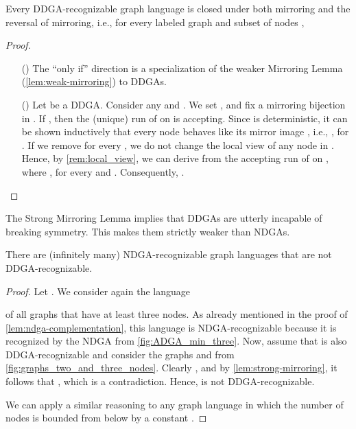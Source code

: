 \documentclass[a4paper,11pt,twoside]{report} \pdfoutput=1
\begin{document}
\begin{lemma} \label{lem:strong-mirroring}
  Every DDGA-recognizable graph language  is closed under both
  mirroring and the reversal of mirroring, i.e., for every labeled
  graph  and subset of nodes ,
  
\end{lemma}

\begin{proof}~
  \vspace{-1ex}
  \begin{itemize}
  \item[()] The “only if” direction is a specialization of the
    weaker Mirroring Lemma (\cref{lem:weak-mirroring}) to DDGAs.
  \item[()] Let  be a DDGA. Consider any
     and . We set ,
    and fix a mirroring bijection  in
    . If , then the (unique) run
     of  on  is
    accepting. Since  is deterministic, it can be shown
    inductively that every node  behaves like its mirror image
    , i.e., , for . If we remove
     for every , we do not change the local view of any
    node in . Hence, by \cref{rem:local_view}, we can derive from
     the accepting run  of  on
    , where , for every  and
    . Consequently, .  \qedhere
  \end{itemize}
\end{proof}

The Strong Mirroring Lemma implies that DDGAs are utterly incapable of
breaking symmetry. This makes them strictly weaker than NDGAs.

\begin{lemma}[] \label{lem:ddga<ndga}
  There are (infinitely many) NDGA-recognizable graph languages that
  are not DDGA-recognizable.
\end{lemma}

\begin{proof}
  Let . We consider again the language
  
  of all graphs that have at least three nodes. As already mentioned
  in the proof of \cref{lem:ndga-complementation}, this language is
  NDGA-recognizable because it is recognized by the NDGA 
  from \cref{fig:ADGA_min_three}. Now, assume that  is
  also DDGA-recognizable and consider the graphs  and
   from
  \cref{fig:graphs_two_and_three_nodes}. Clearly , and
  by \cref{lem:strong-mirroring}, it follows that ,
  which is a contradiction. Hence,  is not
  DDGA-recognizable.

  We can apply a similar reasoning to any graph language
   in which the number of nodes is
  bounded from below by a constant .
\end{proof}
\end{document}
